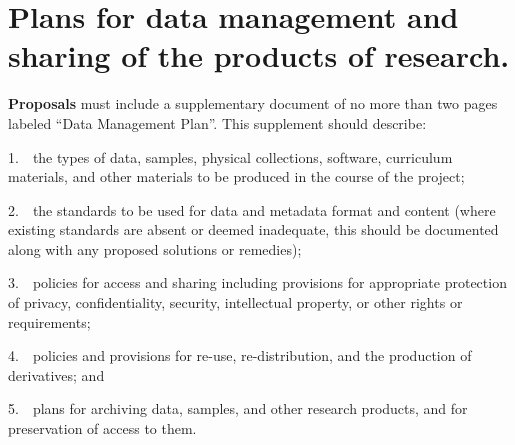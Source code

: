 \section{Plans for data management and sharing of the products of research.}

\textbf{Proposals} must include a supplementary document of no more than
two pages labeled ``Data Management Plan''. This supplement should
describe:

\begin{list}
\item 1.~~the types of data, samples, physical collections, software, curriculum materials, and other materials to be produced in the course of the project;

\item 2.~~the standards to be used for data and metadata format and content (where existing standards are absent or deemed inadequate, this should be documented along with any proposed solutions or remedies);

\item 3.~~policies for access and sharing including provisions for appropriate protection of privacy, confidentiality, security, intellectual property, or other rights or requirements;

\item 4.~~policies and provisions for re-use, re-distribution, and the production of derivatives; and

\item 5.~~plans for archiving data, samples, and other research products, and for preservation of access to them.

\end{list}
